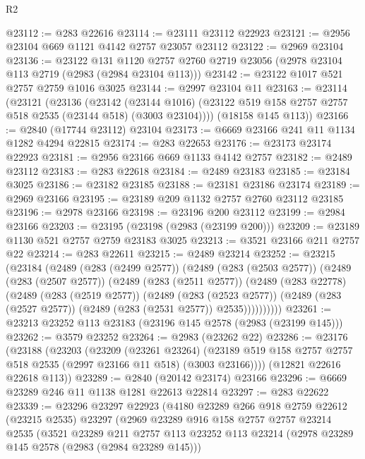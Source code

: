 \begin{lexlean}{R2}
\begin{coremodule}
@23112 := @283 @22616
@23114 := @23111 @23112 @22923
@23121 := @2956 @23104 @669 @1121 @4142 @2757 @23057 @23112
@23122 := @2969 @23104
@23136 := @23122
    @131
    @1120
    @2757
    @2760
    @2719
    @23056
    (@2978 @23104 @113 @2719 (@2983 (@2984 @23104 @113)))
@23142 := @23122 @1017 @521 @2757 @2759 @1016 @3025
@23144 := @2997 @23104 @11
@23163 := @23114
    (@23121
      (@23136
        (@23142
          (@23144 @1016)
          (@23122 @519 @158 @2757 @2757 @518 @2535 (@23144 @518) (@3003 @23104))))
      (@18158 @145 @113))
@23166 := @2840 (@17744 @23112) @23104
@23173 := @6669 @23166 @241 @11 @1134 @1282 @4294 @22815
@23174 := @283 @22653
@23176 := @23173 @23174 @22923
@23181 := @2956 @23166 @669 @1133 @4142 @2757
@23182 := @2489 @23112
@23183 := @283 @22618
@23184 := @2489 @23183
@23185 := @23184 @3025
@23186 := @23182 @23185
@23188 := @23181 @23186 @23174
@23189 := @2969 @23166
@23195 := @23189 @209 @1132 @2757 @2760 @23112 @23185
@23196 := @2978 @23166
@23198 := @23196 @200 @23112
@23199 := @2984 @23166
@23203 := @23195 (@23198 (@2983 (@23199 @200)))
@23209 := @23189 @1130 @521 @2757 @2759 @23183 @3025
@23213 := @3521 @23166 @211 @2757 @22
@23214 := @283 @22611
@23215 := @2489 @23214
@23252 := @23215
    (@23184
      (@2489
        (@283 (@2499 @2577))
        (@2489
          (@283 (@2503 @2577))
          (@2489
            (@283 (@2507 @2577))
            (@2489
              (@283 (@2511 @2577))
              (@2489
                (@283 @22778)
                (@2489
                  (@283 (@2519 @2577))
                  (@2489
                    (@283 (@2523 @2577))
                    (@2489 (@283 (@2527 @2577)) (@2489 (@283 (@2531 @2577)) @2535))))))))))
@23261 := @23213 @23252 @113 @23183 (@23196 @145 @2578 (@2983 (@23199 @145)))
@23262 := @3579 @23252
@23264 := @2983 (@23262 @22)
@23286 := @23176
    (@23188
      (@23203
        (@23209
          (@23261 @23264)
          (@23189 @519 @158 @2757 @2757 @518 @2535 (@2997 @23166 @11 @518) (@3003 @23166))))
      (@12821 @22616 @22618 @113))
@23289 := @2840 (@20142 @23174) @23166
@23296 := @6669 @23289 @246 @11 @1138 @1281 @22613 @22814
@23297 := @283 @22622
@23339 := @23296
    @23297
    @22923
    (@4180
      @23289
      @266
      @918
      @2759
      @22612
      (@23215 @2535)
      @23297
      (@2969
        @23289
        @916
        @158
        @2757
        @2757
        @23214
        @2535
        (@3521
          @23289
          @211
          @2757
          @113
          @23252
          @113
          @23214
          (@2978 @23289 @145 @2578 (@2983 (@2984 @23289 @145)))

\end{coremodule}
\end{lexlean}
